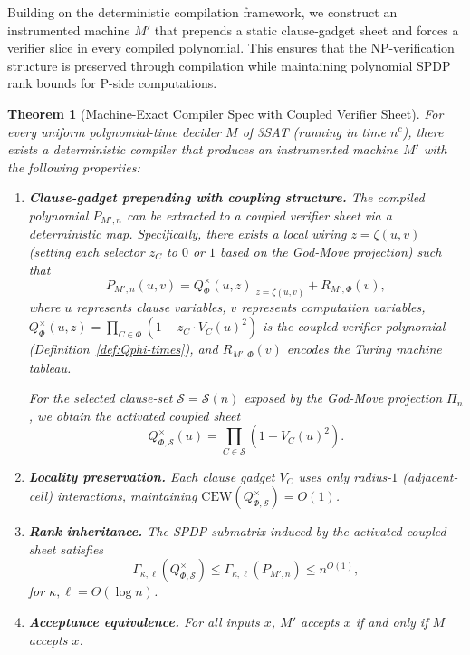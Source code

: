\documentclass[12pt]{article}
\newtheorem{theorem}{Theorem}
\theoremstyle{definition}
\theoremstyle{definition}
\theoremstyle{remark}
\theoremstyle{remark}
\begin{document}
Building on the deterministic compilation framework, we construct an instrumented machine $M'$ that prepends a static clause-gadget sheet and forces a verifier slice in every compiled polynomial. This ensures that the NP-verification structure is preserved through compilation while maintaining polynomial SPDP rank bounds for P-side computations.

\begin{theorem}[Machine-Exact Compiler Spec with Coupled Verifier Sheet]\label{thm:machine-exact-compiler}
For every uniform polynomial-time decider $M$ of 3SAT (running in time $n^c$), there exists a deterministic compiler that produces an instrumented machine $M'$ with the following properties:
\begin{enumerate}
\item \textbf{Clause-gadget prepending with coupling structure.} The compiled polynomial $P_{M',n}$ can be extracted to a coupled verifier sheet via a deterministic map. Specifically, there exists a local wiring $z=\zeta(u,v)$ (setting each selector $z_C$ to $0$ or $1$ based on the God-Move projection) such that
\[
P_{M',n}(u, v) = Q_\Phi^{\times}(u,z)\Big|_{z=\zeta(u,v)} + R_{M',\Phi}(v),
\]
where $u$ represents clause variables, $v$ represents computation variables,
$Q_\Phi^{\times}(u,z) = \prod_{C\in\Phi}(1 - z_C \cdot V_C(u)^2)$ is the coupled verifier polynomial (Definition~\ref{def:Qphi-times}), and $R_{M',\Phi}(v)$ encodes the Turing machine tableau.

For the selected clause-set $\mathcal{S}=\mathcal{S}(n)$ exposed by the God-Move projection $\Pi_n$, we obtain the activated coupled sheet
\[
Q_{\Phi,\mathcal{S}}^{\times}(u) = \prod_{C\in\mathcal{S}}(1-V_C(u)^2).
\]

\item \textbf{Locality preservation.} Each clause gadget $V_C$ uses only radius-$1$ (adjacent-cell) interactions, maintaining $\mathrm{CEW}(Q_{\Phi,\mathcal{S}}^{\times}) = O(1)$.

\item \textbf{Rank inheritance.} The SPDP submatrix induced by the activated coupled sheet satisfies
\[
\Gamma_{\kappa,\ell}(Q_{\Phi,\mathcal{S}}^{\times}) \leq \Gamma_{\kappa,\ell}(P_{M',n}) \leq n^{O(1)},
\]
for $\kappa, \ell = \Theta(\log n)$.

\item \textbf{Acceptance equivalence.} For all inputs $x$, $M'$ accepts $x$ if and only if $M$ accepts $x$.
\end{enumerate}
\end{theorem}
\end{document}

